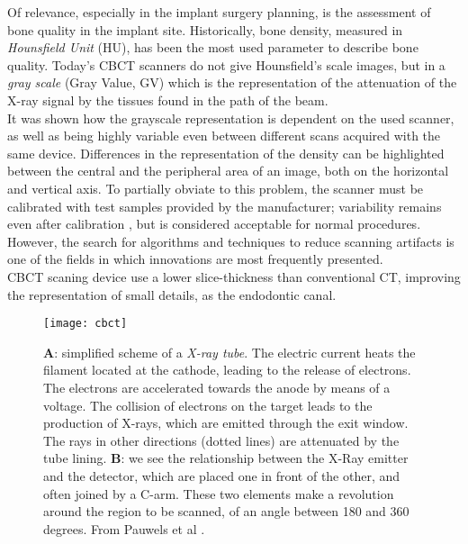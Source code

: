 Of relevance, especially in the implant surgery planning, is the assessment of bone quality in the implant site. Historically, bone density, measured in \emph{Hounsfield Unit} (HU), has been the most used parameter to describe bone quality. Today's CBCT scanners do not give Hounsfield's scale images, but in a \emph{gray scale} (Gray Value, GV) which is the representation of the attenuation of the X-ray signal by the tissues found in the path of the beam. \\ It was shown how the grayscale representation is dependent on the used scanner, as well as being highly variable even between different scans acquired with the same device. Differences in the representation of the density can be highlighted between the central and the peripheral area of an image, both on the horizontal and vertical axis. To partially obviate to this problem, the scanner must be calibrated with test samples provided by the manufacturer; variability remains even after calibration \parencite{Reference17}, but is considered acceptable for normal procedures. However, the search for algorithms and techniques to reduce scanning artifacts is one of the fields in which innovations are most frequently presented.\\
CBCT scaning device use a lower slice-thickness than conventional CT, improving the representation of small details, as the endodontic canal.

\begin{figure}[h]
    \centering
    \texttt{[image: cbct]}
    \caption{\textbf{A}: simplified scheme of a \emph{X-ray tube}. The electric current heats the filament located at the cathode, leading to the release of electrons. The electrons are accelerated towards the anode by means of a voltage. The collision of electrons on the target leads to the production of X-rays, which are emitted through the exit window. The rays in other directions (dotted lines) are attenuated by the tube lining. \textbf{B}: we see the relationship between the X-Ray emitter and the detector, which are placed one in front of the other, and often joined by a C-arm. These two elements make a revolution around the region to be scanned, of an angle between 180 and 360 degrees. From Pauwels et al \parencite{Reference11}.}
    \label{fig: CBCT}
\end{figure}

